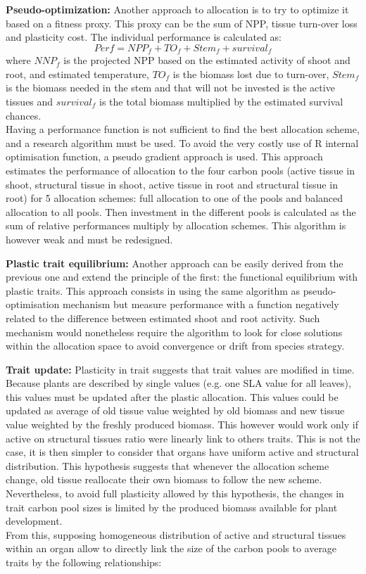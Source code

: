 \documentclass[a4paper,twoside, justified,marginals=raggedright]{tufte-handout}
\begin{document}
\textbf{Pseudo-optimization:} Another approach to allocation is to try to optimize it based on a fitness proxy. This proxy can  be the sum of NPP, tissue turn-over loss and plasticity cost. The individual performance is calculated as:
\begin{equation}
Perf = NPP_{f} + TO_{f} + Stem_{f} + survival_{f}
\end{equation}
where $NNP_{f}$ is the projected NPP based on the estimated activity of shoot and root, and estimated temperature, $TO_{f}$ is the biomass lost due to turn-over, $Stem_{f}$ is the biomass needed in the stem and that will not be invested is the active tissues and $survival_{f}$ is the total biomass multiplied by the estimated survival chances.\\
\indent Having a performance function is not sufficient to find the best allocation scheme, and a research algorithm must be used. To avoid the very costly use of R internal optimisation function, a pseudo gradient approach is used. This approach estimates the performance of allocation to the four carbon pools (active tissue in shoot, structural tissue in shoot, active tissue in root and structural tissue in root) for 5 allocation schemes: full allocation to one of the pools and balanced allocation to all pools. Then investment in the different pools is calculated as the sum of relative performances multiply by allocation schemes. This algorithm is however weak and must be redesigned.

\textbf{Plastic trait equilibrium:} Another approach can be easily derived from the previous one and extend the principle of the first: the functional equilibrium with plastic traits. This approach consists in using the same algorithm as pseudo-optimisation mechanism but measure performance with a function negatively related to the difference between estimated shoot and root activity. Such mechanism would nonetheless require the algorithm to look for close solutions within the allocation space to avoid convergence or drift from species strategy.


\textbf{Trait update:}
Plasticity in trait suggests that trait values are modified in time. Because plants are described by single values (e.g. one SLA value for all leaves), this values must be updated after the plastic allocation. This values could be updated as average of old tissue value weighted by old biomass and new tissue value weighted by the freshly produced biomass. This however would work only if active on structural tissues ratio were linearly link to others traits. This is not the case, it is then simpler to consider that organs have uniform active and structural distribution. This hypothesis suggests that whenever the allocation scheme change, old tissue reallocate their own biomass to follow the new scheme. Nevertheless, to avoid full plasticity allowed by this hypothesis, the changes in trait carbon pool sizes is limited by the produced biomass available for plant development.\\
\indent From this, supposing homogeneous distribution of active and structural tissues within an organ allow to directly link the size of the carbon pools to average traits by the following relationships:
\end{document}
